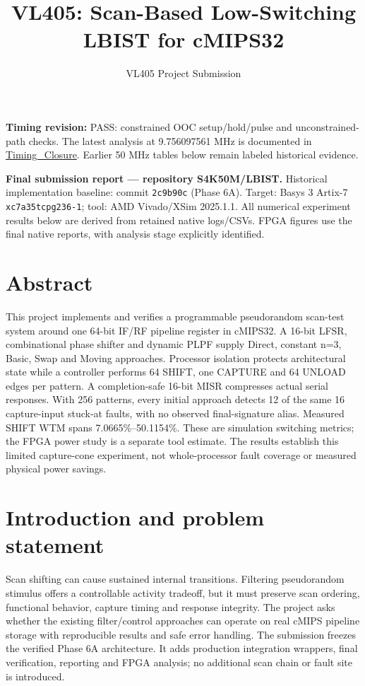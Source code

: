 \documentclass[11pt,a4paper]{article}
\begin{document}
\title{VL405: Scan-Based Low-Switching LBIST for cMIPS32}\author{VL405 Project Submission}\date{}\maketitle\tableofcontents\clearpage


\textbf{Timing revision:} PASS: constrained OOC setup/hold/pulse and unconstrained-path checks. The latest analysis at 9.756097561 MHz is documented in \href{FPGA_Analysis/Timing_Closure/README.md}{Timing\_Closure}. Earlier 50 MHz tables below remain labeled historical evidence.



\textbf{Final submission report --- repository S4K50M/LBIST.} Historical implementation baseline: commit \texttt{2c9b90c} (Phase 6A). Target: Basys 3 Artix-7 \texttt{xc7a35tcpg236-1}; tool: AMD Vivado/XSim 2025.1.1. All numerical experiment results below are derived from retained native logs/CSVs. FPGA figures use the final native reports, with analysis stage explicitly identified.



\section{Abstract}


This project implements and verifies a programmable pseudorandom scan-test system around one 64-bit IF/RF pipeline register in cMIPS32. A 16-bit LFSR, combinational phase shifter and dynamic PLPF supply Direct, constant n=3, Basic, Swap and Moving approaches. Processor isolation protects architectural state while a controller performs 64 SHIFT, one CAPTURE and 64 UNLOAD edges per pattern. A completion-safe 16-bit MISR compresses actual serial responses. With 256 patterns, every initial approach detects 12 of the same 16 capture-input stuck-at faults, with no observed final-signature alias. Measured SHIFT WTM spans 7.0665\%--50.1154\%. These are simulation switching metrics; the FPGA power study is a separate tool estimate. The results establish this limited capture-cone experiment, not whole-processor fault coverage or measured physical power savings.



\section{Introduction and problem statement}


Scan shifting can cause sustained internal transitions. Filtering pseudorandom stimulus offers a controllable activity tradeoff, but it must preserve scan ordering, functional behavior, capture timing and response integrity. The project asks whether the existing filter/control approaches can operate on real cMIPS pipeline storage with reproducible results and safe error handling. The submission freezes the verified Phase 6A architecture. It adds production integration wrappers, final verification, reporting and FPGA analysis; no additional scan chain or fault site is introduced.
\end{document}

